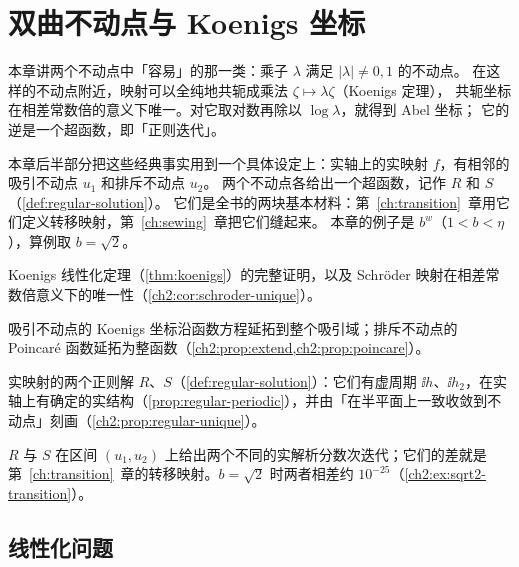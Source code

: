 \chapter{双曲不动点与 Koenigs 坐标}\label{ch:koenigs}

本章讲两个不动点中「容易」的那一类：乘子 $\lambda$ 满足 $|\lambda|\ne0,1$ 的不动点。
在这样的不动点附近，映射可以全纯地共轭成乘法 $\zeta\mapsto\lambda\zeta$（Koenigs 定理），
共轭坐标在相差常数倍的意义下唯一。对它取对数再除以 $\log\lambda$，就得到 Abel 坐标；
它的逆是一个超函数，即「正则迭代」。

本章后半部分把这些经典事实用到一个具体设定上：实轴上的实映射 $f$，有相邻的吸引不动点 $u_1$ 和排斥不动点 $u_2$。
两个不动点各给出一个超函数，记作 $R$ 和 $S$（\cref{def:regular-solution}）。
它们是全书的两块基本材料：第~\ref{ch:transition}~章用它们定义转移映射，第~\ref{ch:sewing}~章把它们缝起来。
本章的例子是 $b^w$（$1<b<\eta$），算例取 $b=\sqrt2$。

\begin{goals}
\item Koenigs 线性化定理（\cref{thm:koenigs}）的完整证明，以及 Schröder 映射在相差常数倍意义下的唯一性（\cref{ch2:cor:schroder-unique}）。
\item 吸引不动点的 Koenigs 坐标沿函数方程延拓到整个吸引域；排斥不动点的 Poincaré 函数延拓为整函数（\cref{ch2:prop:extend,ch2:prop:poincare}）。
\item 实映射的两个正则解 $R$、$S$（\cref{def:regular-solution}）：它们有虚周期 $\ii h$、$\ii h_2$，在实轴上有确定的实结构（\cref{prop:regular-periodic}），并由「在半平面上一致收敛到不动点」刻画（\cref{ch2:prop:regular-unique}）。
\item $R$ 与 $S$ 在区间 $(u_1,u_2)$ 上给出两个不同的实解析分数次迭代；它们的差就是第~\ref{ch:transition}~章的转移映射。$b=\sqrt2$ 时两者相差约 $10^{-25}$（\cref{ch2:ex:sqrt2-transition}）。
\end{goals}

\section{线性化问题}\label{ch2:sec:linearization}

